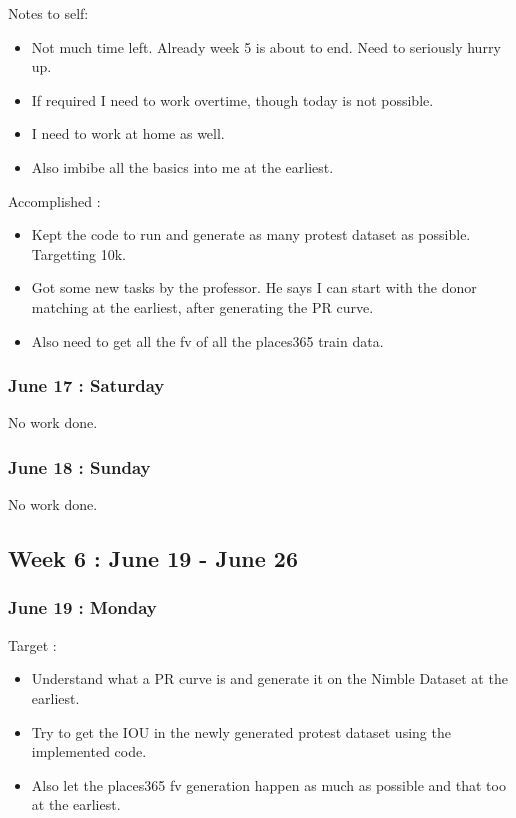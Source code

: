 \documentclass{article}
\begin{document}
Notes to self:
\begin{itemize}
\item Not much time left. Already week 5 is about to end. Need to seriously hurry up.
\item If required I need to work overtime, though today is not possible.
\item I need to work at home as well.
\item Also imbibe all the basics into me at the earliest.
\end{itemize}

Accomplished :
\begin{itemize}
\item Kept the code to run and generate as many protest dataset as possible. Targetting 10k.
\item Got some new tasks by the professor. He says I can start with the donor matching at the earliest, after generating the PR curve. 
\item Also need to get all the fv of all the places365 train data. 
\end{itemize}

\subsubsection{June 17 : Saturday}
No work done.

\subsubsection{June 18 : Sunday}
No work done.

\subsection{Week 6 : June 19 - June 26}
\subsubsection{June 19 : Monday}
Target :
\begin{itemize}
\item Understand what a PR curve is and generate it on the Nimble Dataset at the earliest.
\item Try to get the IOU in the newly generated protest dataset using the implemented code.
\item Also let the places365 fv generation happen as much as possible and that too at the earliest.
\end{itemize}
\end{document}
